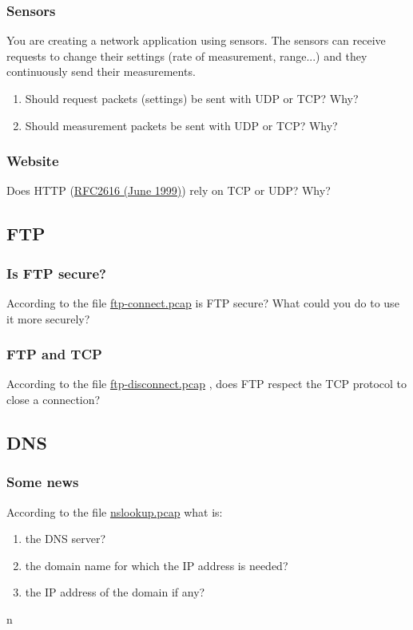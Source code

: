 \documentclass[11pt]{article}
\begin{document}
\subsubsection{Sensors}
You are creating a network application using sensors. The sensors can receive requests to change their settings (rate of measurement, range...) and they continuously send their measurements.
  \begin{enumerate}
    \item Should request packets (settings) be sent with UDP or TCP? Why?
    \item Should measurement packets be sent with UDP or TCP? Why?
  \end{enumerate}
\subsubsection{Website}
Does HTTP (\color{blue}\href{http://tools.ietf.org/html/rfc2616}{RFC2616 (June 1999)}) \color{black} rely on TCP or UDP? Why?

\subsection{FTP}
\subsubsection{Is FTP secure?}
According to the file \color{blue}\href{http://teaching.auzias.net/db/ftp-connect.pcap}{ftp-connect.pcap} \color{black} is FTP secure? What could you do to use it more securely?
\subsubsection{FTP and TCP}
According to the file \color{blue}\href{http://teaching.auzias.net/db/ftp-disconnect.pcap}{ftp-disconnect.pcap} \color{black}, does FTP respect the TCP protocol to close a connection?

\subsection{DNS}
\subsubsection{Some news}
According to the file \color{blue}\href{http://teaching.auzias.net/db/nslookup.pcap}{nslookup.pcap} \color{black} what is:
  \begin{enumerate}
    \item the DNS server?
    \item the domain name for which the IP address is needed?
    \item the IP address of the domain if any?
  \end{enumerate}n
\end{document}
